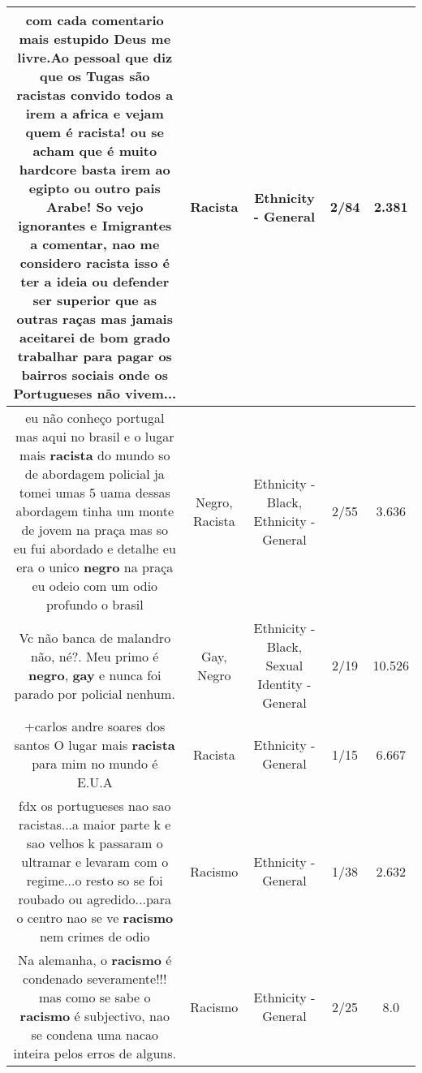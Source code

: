 \documentclass[11pt]{article}
\newlength\mylength
\begin{document}
\begin{center}
\begin{longtable}{|C{.65\mylength}|C{.30\mylength}|C{.12\mylength}|C{.12\mylength}|C{.12\mylength}|}
  \small com cada comentario mais estupido Deus me livre.Ao pessoal que diz que os Tugas são racistas convido todos a irem a africa e vejam quem é \textbf{racista}! ou se acham que é muito hardcore basta irem ao egipto ou outro pais Arabe! So vejo ignorantes e Imigrantes a comentar, nao me considero \textbf{racista} isso é ter a ideia ou defender ser superior que as outras raças mas jamais aceitarei de bom grado trabalhar para pagar os bairros sociais onde os Portugueses não vivem...\normalsize   & Racista & Ethnicity - General & 2/84 & 2.381 \\  \hline
  \small eu não conheço portugal mas aqui no brasil e o lugar mais \textbf{racista} do mundo so de abordagem policial ja tomei umas 5 uama dessas abordagem tinha um monte de jovem na praça mas so eu fui abordado e detalhe eu era o unico \textbf{negro} na praça eu odeio com um odio profundo o brasil\normalsize   & Negro, Racista & Ethnicity - Black, Ethnicity - General & 2/55 & 3.636 \\  \hline
  \small Vc não banca de malandro não, né?. Meu primo é \textbf{negro}, \textbf{gay} e nunca foi parado por policial nenhum.\normalsize   & Gay, Negro & Ethnicity - Black, Sexual Identity - General & 2/19 & 10.526 \\  \hline
  \small +carlos andre soares dos santos O lugar mais \textbf{racista} para mim no mundo é E.U.A\normalsize   & Racista & Ethnicity - General & 1/15 & 6.667 \\  \hline
  \small fdx os portugueses nao sao racistas...a maior parte k e sao velhos k passaram o ultramar e levaram com o regime...o resto so se foi roubado ou agredido...para o centro nao se ve \textbf{racismo} nem crimes de odio\normalsize   & Racismo & Ethnicity - General & 1/38 & 2.632 \\  \hline
  \small Na alemanha, o \textbf{racismo} é condenado severamente!!! mas como se sabe o \textbf{racismo} é subjectivo, nao se condena uma nacao inteira pelos erros de alguns.\normalsize   & Racismo & Ethnicity - General & 2/25 & 8.0 \\  \hline

\end{longtable}
\end{center}
\end{document}
